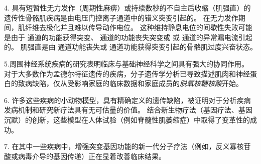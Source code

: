 4. 具有短暂性无力发作（周期性麻痹）或持续数秒的不自主后收缩（肌强直）的遗传性骨骼肌疾病是由电压门控离子通道中的错义突变引起的。
在无力发作期间，肌纤维去极化并且难以传导动作电位。
这种维持静息电位的间歇性失败可能是由于  通道的功能获得突变、 通道的功能丧失突变或  或  通道的异常漏电流引起的。
肌强直是由  通道功能丧失或  通道功能获得突变引起的骨骼肌过度兴奋状态。


5.周围神经系统疾病的研究表明临床与基础神经科学之间具有强大的协同作用。
对于大多数作为孟德尔特征遗传的疾病，分子遗传学分析已导致描述肌肉和神经蛋白的致病缺陷，仅从受影响家庭的临床数据和家庭成员的\textit{脱氧核糖核酸}开始。


6. 许多这些疾病的小动物模型，具有精确定义的遗传缺陷，被证明对于分析疾病发病机制和研究新疗法具有无可估量的价值。
结合新生物疗法（基因疗法、基因沉默）的创新，这些模型在人体试验（例如脊髓性肌萎缩症）中取得了变革性的成功。


7. 在其中一些疾病中，增强突变基因功能的新一代分子疗法（例如，反义寡核苷酸或病毒介导的基因传递）正在显着改善临床结果。


